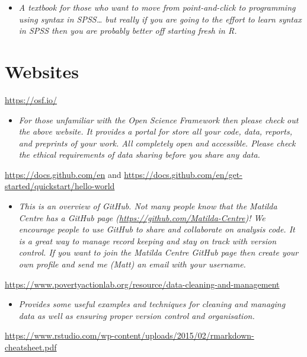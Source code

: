 \documentclass[
]{book}
\providecommand{\tightlist}{%
  \setlength{\itemsep}{0pt}\setlength{\parskip}{0pt}}
\begin{document}
\begin{itemize}
\tightlist
\item
  \emph{A textbook for those who want to move from point-and-click to programming using syntax in SPSS\ldots{} but really if you are going to the effort to learn syntax in SPSS then you are probably better off starting fresh in R.}
\end{itemize}

\section{Websites}\label{websites}

\url{https://osf.io/}

\begin{itemize}
\tightlist
\item
  \emph{For those unfamiliar with the Open Science Framework then please check out the above website. It provides a portal for store all your code, data, reports, and preprints of your work. All completely open and accessible. Please check the ethical requirements of data sharing before you share any data.}
\end{itemize}

\url{https://docs.github.com/en} and \url{https://docs.github.com/en/get-started/quickstart/hello-world}

\begin{itemize}
\tightlist
\item
  \emph{This is an overview of GitHub. Not many people know that the Matilda Centre has a GitHub page (\url{https://github.com/Matilda-Centre})! We encourage people to use GitHub to share and collaborate on analysis code. It is a great way to manage record keeping and stay on track with version control. If you want to join the Matilda Centre GitHub page then create your own profile and send me (Matt) an email with your username.}
\end{itemize}

\url{https://www.povertyactionlab.org/resource/data-cleaning-and-management}

\begin{itemize}
\tightlist
\item
  \emph{Provides some useful examples and techniques for cleaning and managing data as well as ensuring proper version control and organisation.}
\end{itemize}

\url{https://www.rstudio.com/wp-content/uploads/2015/02/rmarkdown-cheatsheet.pdf}
\end{document}
